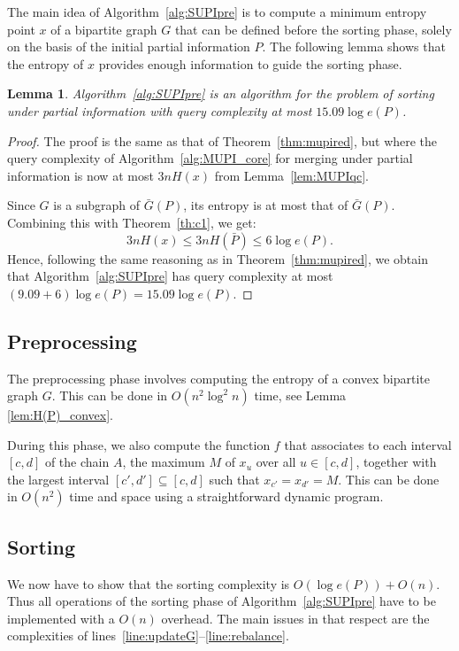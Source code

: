 \documentclass{article} \usepackage{fullpage}
\newtheorem{lemma}{Lemma}
\newcommand{\ent}{H}
\begin{document}
The main idea of Algorithm~\ref{alg:SUPIpre} is to compute a minimum entropy point $x$ of a bipartite graph $G$ that can be defined before the sorting phase, solely on the basis of the initial partial information $P$. The following lemma shows that the entropy of $x$ provides enough information to guide
the sorting phase.

\begin{lemma}
Algorithm~\ref{alg:SUPIpre} is an algorithm for the problem of sorting under partial information with query complexity at most $15.09 \log e(P)$.
\end{lemma}
\begin{proof}
The proof is the same as that of Theorem~\ref{thm:mupired}, but where the query complexity of Algorithm~\ref{alg:MUPI_core} for merging under partial information is now at most $3n\ent (x)$ from Lemma~\ref{lem:MUPIqc}.

Since $G$ is a subgraph of $\bar{G}(P)$, its entropy is at most that of $\bar{G}(P)$. Combining this with Theorem~\ref{th:c1}, we get:
$$
3n\ent (x) \leq 3n\ent(\bar{P}) \leq 6\log e(P) .
$$
Hence, following the same reasoning as in Theorem~\ref{thm:mupired}, we obtain that Algorithm~\ref{alg:SUPIpre} has query complexity at most $(9.09 + 6)\log e(P) = 15.09 \log e(P)$.
\end{proof}

\subsection{Preprocessing}

The preprocessing phase involves computing the entropy of a convex bipartite graph $G$. This can be done in $O(n^2 \log^2 n)$ time, see Lemma \ref{lem:H(P)_convex}.

During this phase, we also compute the function $f$ that associates to each interval $[c,d]$ of the chain $A$, the maximum $M$ of $x_{u}$ over all $u \in [c, d]$, together with the largest interval $[c', d'] \subseteq [c, d]$ such that $x_{c'} = x_{d'}= M$. This can be done in $O(n^{2})$ time and space using a straightforward dynamic program.

\subsection{Sorting}

We now have to show that the sorting complexity is $O(\log e(P)) + O(n)$. Thus all operations of the sorting phase of Algorithm~\ref{alg:SUPIpre} have to be implemented with a $O(n)$ overhead. The main issues in that respect are the complexities of lines~\ref{line:updateG}--\ref{line:rebalance}.
\end{document}
